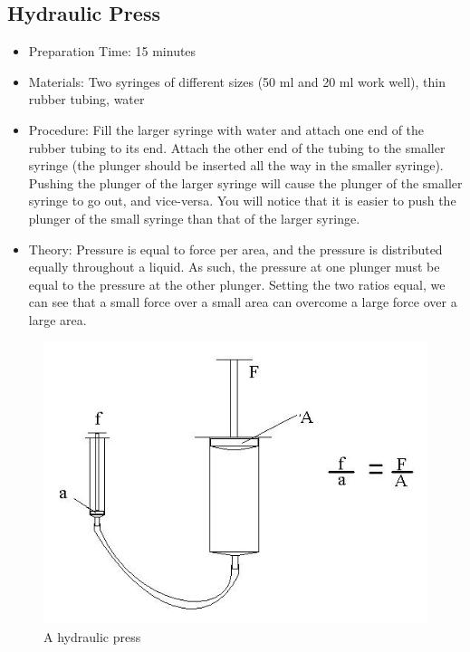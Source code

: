 \subsection{Hydraulic Press}
\begin{itemize}
\item{Preparation Time: 15 minutes}
\item{Materials: Two syringes of different sizes (50 ml and 20 ml work well), thin rubber tubing, water}
\item{Procedure: Fill the larger syringe with water and attach one end of the rubber tubing to its end. Attach the other end of the tubing to the smaller syringe (the plunger should be inserted all the way in the smaller syringe). Pushing the plunger of the larger syringe will cause the plunger of the smaller syringe to go out, and vice-versa. You will notice that it is easier to push the plunger of the small syringe than that of the larger syringe.}
\item{Theory: Pressure is equal to force per area, and the pressure is distributed equally throughout a liquid. As such, the pressure at one plunger must be equal to the pressure at the other plunger. Setting the two ratios equal, we can see that a small force over a small area can overcome a large force over a large area.}
\end{itemize}

\begin{figure}[h!]
\begin{center}
\includegraphics{./img/hydraulic-press.png}
\caption{A hydraulic press}
\label{fig:hydraulic-press}
\end{center}
\end{figure}
	

